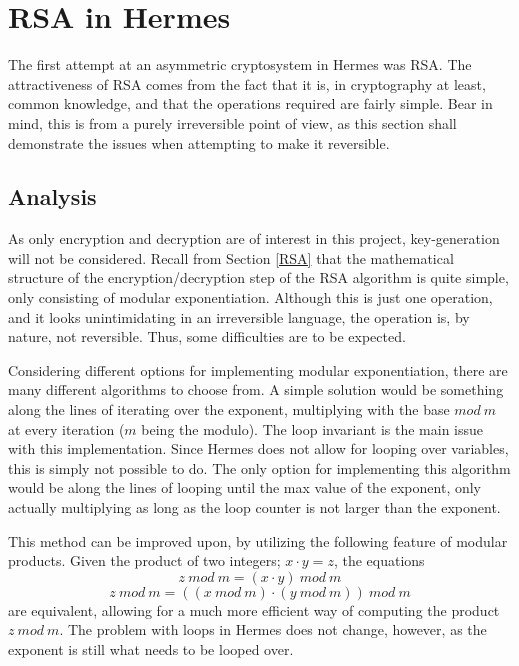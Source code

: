 

\chapter{RSA in Hermes}
\label{OurRSA}
The first attempt at an asymmetric cryptosystem in Hermes was RSA. The attractiveness of RSA comes from the fact that it is, in cryptography at least, common knowledge, and that the operations required are fairly simple. Bear in mind, this is from a purely irreversible point of view, as this section shall demonstrate the issues when attempting to make it reversible.
\section{Analysis}

As only encryption and decryption are of interest in this project, key-generation will not be considered. Recall from Section \ref{RSA} that the mathematical structure of the encryption/decryption step of the RSA algorithm is quite simple, only consisting of modular exponentiation. Although this is just one operation, and it looks unintimidating in an irreversible language, the operation is, by nature, not reversible\cite{RSAProblem}. Thus, some difficulties are to be expected. 

Considering different options for implementing modular exponentiation, there are many different algorithms to choose from. A simple solution would be something along the lines of iterating over the exponent, multiplying with the base $mod ~m$ at every iteration ($m$ being the modulo). The loop invariant is the main issue with this implementation. Since Hermes does not allow for looping over variables, this is simply not possible to do. The only option for implementing this algorithm would be along the lines of looping until the max value of the exponent, only actually multiplying as long as the loop counter is not larger than the exponent.

This method can be improved upon, by utilizing the following feature of modular products. Given the product of two integers; $x\cdot y=z$, the equations
\[z~mod~m=(x\cdot y)~mod~m\]
\[z~mod~m=((x~mod~m)\cdot (y~mod~m))~mod~m\]
are equivalent, allowing for a much more efficient way of computing the product $z~mod~m$. The problem with loops in Hermes does not change, however, as the exponent is still what needs to be looped over.\\

